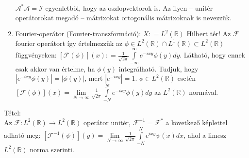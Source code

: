 \documentclass[12pt,a4paper]{scrartcl}
\newenvironment{tetel}{}{}
\newenvironment{pelda}{}{}
\begin{document}
\begin{pelda}
\begin{enumerate}
  \(\mathcal{A}^{*}\mathcal{A} = \mathcal{I}\) egyenletből, hogy az
  oszlopvektorok is. Az ilyen -- unitér operátorokat megadó --
  mátrixokat ortogonális mátrixoknak is nevezzük.
\item
  Fourier-operátor (Fourier-transzformáció):
  \(X: = L^{2}\left( {\mathbb{R}} \right)\) Hilbert tér! Az
  \(\mathcal{F}\) fourier operátort így értelmezzük az
  \(\phi \in L^{2}\left( {\mathbb{R}} \right) \cap L^{1}\left( {\mathbb{R}} \right) \subset L^{2}\left( {\mathbb{R}} \right)\)
  függvényeken:
  \(\left\lbrack {\mathcal{F}\left( \phi \right)} \right\rbrack\left( x \right): = \frac{1}{\sqrt{2\pi}}{\int\limits_{- \infty}^{\infty}{e^{- ixy}\phi\left( y \right)dy}}\).
  Látható, hogy ennek csak akkor van értelme, ha
  \(\phi\left( y \right)\) integrálható. Tudjuk, hogy
  \(\left| {e^{- ixy}\phi\left( y \right)} \right| = \left| {\phi\left( y \right)} \right|\),
  mert \(\left| e^{- ixy} \right| = 1\).
  \(\phi \in L^{2}\left( {\mathbb{R}} \right)\) esetén
  \(\left\lbrack {\mathcal{F}\left( \phi \right)} \right\rbrack\left( x \right) = \lim\limits_{N\rightarrow\infty}\frac{1}{\sqrt{2\pi}}{\int\limits_{- N}^{N}{e^{- ixy}\phi\left( y \right)dy}}\)
  az \(L^{2}\left( {\mathbb{R}} \right)\) normával.
\end{enumerate}

\end{pelda}

\begin{tetel}

Tétel:\\
Az
\(\left. \mathcal{F}:L^{2}\left( {\mathbb{R}} \right)\rightarrow L^{2}\left( {\mathbb{R}} \right) \right.\)
operátor unitér, \(\mathcal{F}^{- 1} = \mathcal{F}^{*}\) a következő
képlettel adható meg:
\(\left\lbrack {\mathcal{F}^{- 1}\left( \psi \right)} \right\rbrack\left( y \right) = \lim\limits_{N\rightarrow\infty}\frac{1}{\sqrt{2\pi}}{\int\limits_{- N}^{N}{e^{ixy}\psi\left( x \right)dx}}\),
ahol a limesz \(L^{2}\left( {\mathbb{R}} \right)\) norma szerinti.

\end{tetel}
\end{document}
